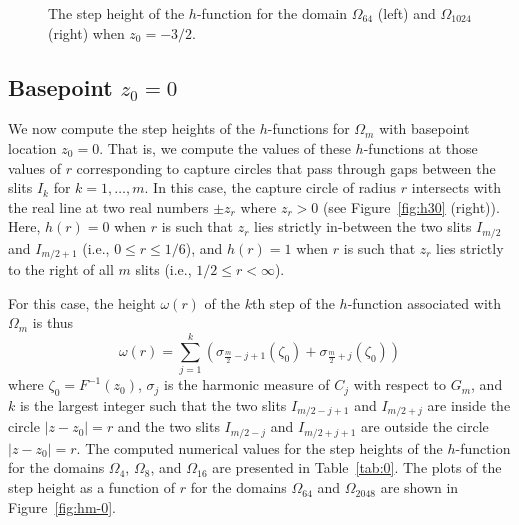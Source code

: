 \begin{figure}[ht] %
\centerline{
\hfill
{}
}
\caption{The step height of the $h$-function for the domain $\Omega_{64}$ (left) and $\Omega_{1024}$ (right) when $z_0=-3/2$.}
\label{fig:hm-3}
\end{figure}


\subsection{Basepoint $z_0=0$}

We now compute the step heights of the $h$-functions for $\Omega_m$ with basepoint location $z_0=0$. That is, we compute the values of these $h$-functions at those values of $r$ corresponding to capture circles that pass through gaps between the slits $I_{k}$ for $k=1,\ldots,m$.	
In this case, the capture circle of radius $r$ intersects with the real line at two real numbers $\pm z_r$ where $z_r>0$ (see Figure~\ref{fig:h30} (right)).
Here, $h(r) = 0$ when $r$ is such that $z_r$ lies strictly in-between the two slits $I_{m/2}$ and $I_{m/2+1}$ (i.e., $0\le r\le1/6$), and $h(r) = 1$ when $r$ is such that $z_r$ lies strictly to the right of all $m$ slits (i.e., $1/2\le  r<\infty$). 

For this case, the height $\omega(r)$ of the $k$th step of the $h$-function associated with $\Omega_m$ is thus
\begin{equation}\label{eq:wr-0}
\omega(r)=\sum_{j=1}^{k}\left(\sigma_{\frac{m}{2}-j+1}(\zeta_0)+\sigma_{\frac{m}{2}+j}(\zeta_0)\right)
\end{equation}
where $\zeta_0=F^{-1}(z_0)$, $\sigma_j$ is the harmonic measure of $C_j$ with respect to $G_m$, and $k$ is the largest integer such that the two slits $I_{m/2-j+1}$ and $I_{m/2+j}$ are inside the circle $|z-z_0|=r$ and the two slits $I_{m/2-j}$ and $I_{m/2+j+1}$ are outside the circle $|z-z_0|=r$.
The computed numerical values for the step heights of the $h$-function for the domains $\Omega_4$, $\Omega_8$, and $\Omega_{16}$ are presented in Table~\ref{tab:0}. The plots of the step height as a function of $r$ for the domains $\Omega_{64}$ and $\Omega_{2048}$ are shown in Figure~\ref{fig:hm-0}.


